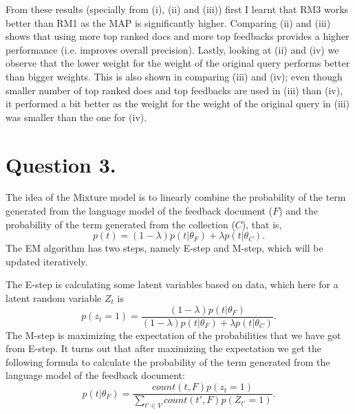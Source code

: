 \documentclass[11pt]{article}
\begin{document}
From these results (specially from (i), (ii) and (iii)) first I learnt that RM3 works better than RM1 as the MAP is significantly higher. Comparing (ii) and (iii) shows that using more top ranked docs and more top feedbacks provides a higher performance (i.e. improves overall precision). Lastly, looking at (ii) and (iv) we observe that the lower weight for the weight of the original query performs better than bigger weights. This is also shown in comparing (iii) and (iv); even though smaller number of top ranked docs and top feedbacks are used in (iii) than (iv), it performed a bit better as the weight for the weight of the original query in (iii) was smaller than the one for (iv).

\section*{Question 3.}%


The idea of the Mixture model is to linearly combine the probability of the term generated from the language model of the feedback document ($F$) and the probability of the term generated from the collection ($C$), that is, 
$$p(t) = (1 - \lambda) p(t| \theta_F) + \lambda p(t|\theta_C).$$
The EM algorithm has two steps, namely E-step and M-step, which will be updated iteratively. 

The E-step is calculating some latent variables based on data, which here for a latent random variable $Z_t$ is 
$$p(z_t=1) = \frac{(1 - \lambda) p(t| \theta_F)}{(1 - \lambda) p(t| \theta_F) + \lambda p(t|\theta_C)}.$$
The M-step is maximizing the expectation of the probabilities that we have got from E-step. It turns out that after maximizing the expectation we get the following formula to calculate the probability of the term generated from the language model of the feedback document:
$$p(t| \theta_F) = \frac{count(t, F) p(z_t=1)}{\sum_{t' \in V} count(t', F) p(Z_{t'}=1)}.$$
\end{document}
